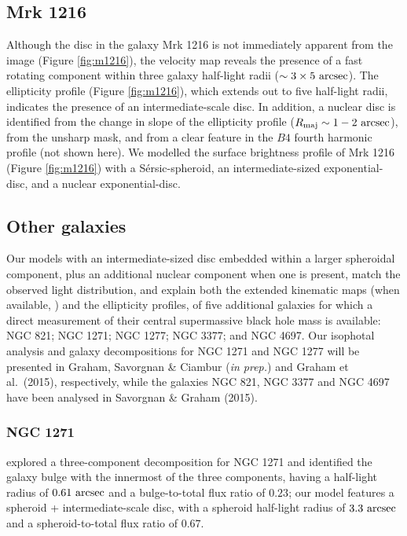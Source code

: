 \documentclass[useAMS,usenatbib,article]{mnras}
\begin{document}
\subsection{Mrk 1216}
Although the disc in the galaxy Mrk 1216 is not immediately apparent from the image (Figure \ref{fig:m1216}), 
the velocity map \citep{yildirim2015} reveals the presence of a fast rotating component 
within three galaxy half-light radii ($\sim 3 \times 5~\rm arcsec$). 
The ellipticity profile (Figure \ref{fig:m1216}), 
which extends out to five half-light radii, indicates the presence of an intermediate-scale disc. 
In addition, a nuclear disc is identified from the change in slope of the ellipticity profile ($R_{\rm maj} \sim 1 - 2 \rm~arcsec$), 
from the unsharp mask, 
and from a clear feature in the $B4$ fourth harmonic profile (not shown here). 
We modelled the surface brightness profile of Mrk 1216 (Figure \ref{fig:m1216}) with a S\'ersic-spheroid, 
an intermediate-sized exponential-disc, and a nuclear exponential-disc. 

\subsection{Other galaxies}
Our models with an intermediate-sized disc embedded within a larger spheroidal component, 
plus an additional nuclear component when one is present, 
match the observed light distribution, and explain both the extended kinematic maps (when available, \citealt{arnold2014}) and the ellipticity profiles, 
of five additional galaxies for which a direct measurement of their central supermassive black hole mass is available: 
NGC 821; NGC 1271; NGC 1277; NGC 3377; and NGC 4697. 
Our isophotal analysis and galaxy decompositions for NGC 1271 and NGC 1277 will be presented in 
Graham, Savorgnan \& Ciambur (\emph{in prep.}) and Graham et al.~(2015), respectively, 
while the galaxies NGC 821, NGC 3377 and NGC 4697 have been analysed in Savorgnan \& Graham (2015). 

\subsubsection{NGC 1271}
\cite{walsh2015} explored a three-component decomposition for NGC 1271 
and identified the galaxy bulge with the innermost of the three components, 
having a half-light radius of $0.61~\rm arcsec$ and a bulge-to-total flux ratio of $0.23$; 
our model features a spheroid + intermediate-scale disc, 
with a spheroid half-light radius of $3.3~\rm arcsec$ and a spheroid-to-total flux ratio of $0.67$. 
\end{document}
